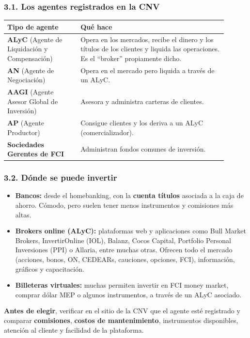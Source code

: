 \subsubsection*{3.1. Los agentes registrados en la CNV}
\begin{center}
\small
\begin{tabular}{|p{0.30\linewidth}|p{0.60\linewidth}|}
\hline
\textbf{Tipo de agente} & \textbf{Qué hace} \\ \hline
\textbf{ALyC} (Agente de Liquidación y Compensación) & Opera en los mercados, recibe el dinero
y los títulos de los clientes y liquida las operaciones. Es el ``broker'' propiamente dicho. \\
\hline
\textbf{AN} (Agente de Negociación) & Opera en el mercado pero liquida a través de un ALyC. \\
\hline
\textbf{AAGI} (Agente Asesor Global de Inversión) & Asesora y administra carteras de clientes. \\
\hline
\textbf{AP} (Agente Productor) & Consigue clientes y los deriva a un ALyC (comercializador). \\
\hline
\textbf{Sociedades Gerentes de FCI} & Administran fondos comunes de inversión. \\ \hline
\end{tabular}
\end{center}

\subsubsection*{3.2. Dónde se puede invertir}
\begin{itemize}
  \item \textbf{Bancos:} desde el homebanking, con la \textbf{cuenta títulos} asociada a la caja
        de ahorro. Cómodo, pero suelen tener menos instrumentos y comisiones más altas.
  \item \textbf{Brokers online (ALyC):} plataformas web y aplicaciones como Bull Market Brokers,
        InvertirOnline (IOL), Balanz, Cocos Capital, Portfolio Personal Inversiones (PPI) o
        Allaria, entre muchas otras. Ofrecen todo el mercado (acciones, bonos, ON, CEDEARs,
        cauciones, opciones, FCI), información, gráficos y capacitación.
  \item \textbf{Billeteras virtuales:} muchas permiten invertir en FCI money market, comprar
        dólar MEP o algunos instrumentos, a través de un ALyC asociado.
\end{itemize}
\textbf{Antes de elegir}, verificar en el sitio de la CNV que el agente esté registrado y
comparar \textbf{comisiones}, \textbf{costos de mantenimiento}, instrumentos disponibles,
atención al cliente y facilidad de la plataforma.

